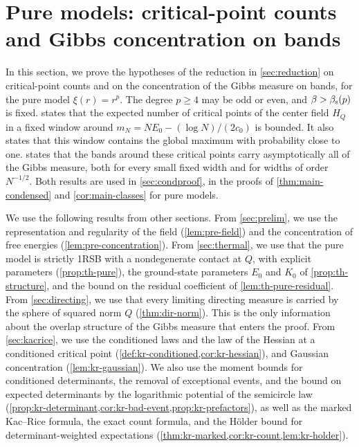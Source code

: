\chapter{Pure models: critical-point counts and Gibbs concentration on bands}\label{sec:purecover}

In this section, we prove the hypotheses of the reduction in \cref{sec:reduction} on critical-point counts and on the concentration of the Gibbs measure on bands, for the pure model $\xi(r)=r^p$. The degree $p\ge4$ may be odd or even, and $\beta>\beta_{\mathrm s}(p)$ is fixed.  states that the expected number of critical points of the center field $H_Q$ in a fixed window around $m_N=NE_0-(\log N)/(2c_0)$ is bounded. It also states that this window contains the global maximum with probability close to one.  states that the bands around these critical points carry asymptotically all of the Gibbs measure, both for every small fixed width and for widths of order $N^{-1/2}$. Both results are used in \cref{sec:condproof}, in the proofs of \cref{thm:main-condensed} and \cref{cor:main-classes} for pure models.

We use the following results from other sections. From \cref{sec:prelim}, we use the representation and regularity of the field (\cref{lem:pre-field}) and the concentration of free energies (\cref{lem:pre-concentration}). From \cref{sec:thermal}, we use that the pure model is strictly 1RSB with a nondegenerate contact at $Q$, with explicit parameters (\cref{prop:th-pure}), the ground-state parameters $E_0$ and $K_0$ of \cref{prop:th-structure}, and the bound on the residual coefficient of \cref{lem:th-pure-residual}. From \cref{sec:directing}, we use that every limiting directing measure is carried by the sphere of squared norm $Q$ (\cref{thm:dir-norm}). This is the only information about the overlap structure of the Gibbs measure that enters the proof. From \cref{sec:kacrice}, we use the conditioned laws and the law of the Hessian at a conditioned critical point (\cref{def:kr-conditioned,cor:kr-hessian}), and Gaussian concentration (\cref{lem:kr-gaussian}). We also use the moment bounds for conditioned determinants, the removal of exceptional events, and the bound on expected determinants by the logarithmic potential of the semicircle law (\cref{prop:kr-determinant,cor:kr-bad-event,prop:kr-prefactors}), as well as the marked Kac--Rice formula, the exact count formula, and the H\"older bound for determinant-weighted expectations (\cref{thm:kr-marked,cor:kr-count,lem:kr-holder}).

